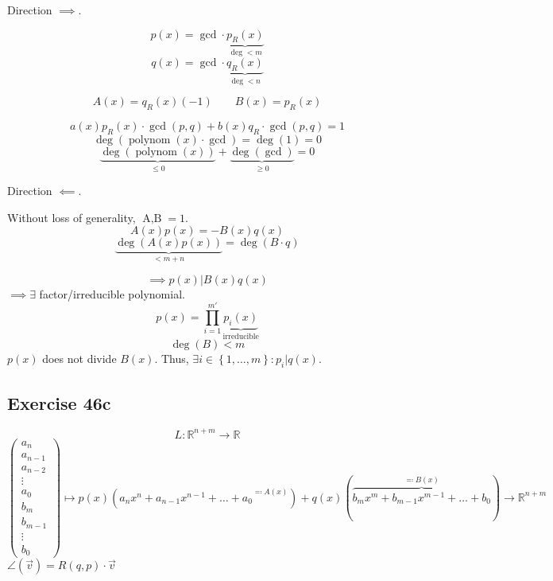 \documentclass[a4paper]{article}
\theoremstyle{definition}
\newcommand\set[1]{\left\{#1\right\}}
\begin{document}
Direction $\implies$.

\[ p(x) = \operatorname{gcd} \cdot \underbrace{p_R(x)}_{\deg < m} \]
\[ q(x) = \operatorname{gcd} \cdot \underbrace{q_R(x)}_{\deg < n} \]

\[ A(x) = q_R(x)(-1) \qquad B(x) = p_R(x) \]

\[ a(x) p_R(x) \cdot \operatorname{gcd}(p, q) + b(x) q_R \cdot \operatorname{gcd}(p, q) = 1 \]
\[ \deg(\operatorname{polynom}(x) \cdot \operatorname{gcd}) = \deg(1) = 0 \]
\[ \underbrace{\deg(\operatorname{polynom}(x))}_{\leq 0} + \underbrace{\deg(\operatorname{gcd})}_{\geq 0} = 0 \]

Direction $\impliedby$.

Without loss of generality, $\operatorname{A, B} = 1$.
\[ A(x) p(x) = -B(x) q(x) \]
\[ \underbrace{\deg(A(x) p(x))}_{< m + n} = \deg(B \cdot q) \]

\[ \implies p(x) | B(x) q(x) \]
$\implies \exists$ factor/irreducible polynomial.
\[ p(x) = \prod_{i=1}^{m'} \underbrace{p_i(x)}_{\text{irreducible}} \]
\[ \deg(B) < m \]
$p(x)$ does not divide $B(x)$. Thus, $\exists i \in \set{1, \dots, m}: p_i | q(x)$.

\subsection{Exercise 46c}

\[ L: \mathbb R^{n + m} \to \mathbb R \]
\[ \begin{pmatrix} a_n \\ a_{n-1} \\ a_{n-2} \\ \vdots \\ a_0 \\ b_m \\ b_{m-1} \\ \vdots \\ b_0 \end{pmatrix} \mapsto p(x) ({a_n x^n + a_{n-1} x^{n-1} + \dots + a_0}^{\eqqcolon A(x)}) + q(x) (\overbrace{b_m x^m + b_{m-1} x^{m-1} + \dots + b_0}^{\eqqcolon B(x)}) \to \mathbb R^{n + m} \]
$\angle(\vec v) = R(q, p) \cdot \vec v$
\end{document}
